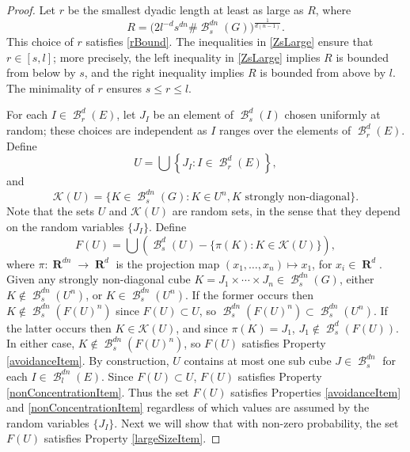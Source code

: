 \documentclass[dvipsnames,letterpaper,12pt]{article}
\numberwithin{equation}{section}
\theoremstyle{plain}
\theoremstyle{remark}
\DeclareMathOperator{\RR}{\mathbf{R}}
\DeclareMathOperator{\setcolon}{\colon}
\DeclareMathOperator{\B}{\mathcal{B}}
\begin{document}
\begin{proof}
	Let $r$ be the smallest dyadic length at least as large as $R$, where
	\begin{equation} \label{What-is-r}
		R = \big(2 l^{-d}s^{dn}\# \B^{dn}_s(G)\big)^{\frac{1}{d(n-1)}}.
	\end{equation} 
	This choice of $r$ satisfies \eqref{rBound}. 
	The inequalities in \eqref{ZsLarge} ensure that $r \in [s,l]$; more precisely, the left inequality in \eqref{ZsLarge} implies $R$ is bounded from below by $s$, and the right inequality implies $R$ is bounded from above by $l$. The minimality of $r$ ensures $s \leq r \leq l$.

	For each $I \in \B_r^d(E)$, let $J_I$ be an element of $\B^d_s(I)$ chosen uniformly at random; these choices are independent as $I$ ranges over the elements of $\B_r^d(E)$. Define
	\[ 	U = \bigcup \left\{ J_I \setcolon I \in \B_r^d(E) \right\}, \]
	and
	\[ \mathcal{K}(U) = \{ K \in \B^{dn}_s(G) \setcolon K \in U^n, \text{$K$ strongly non-diagonal} \}. \]
	Note that the sets $U$ and $\mathcal{K}(U)$ are random sets, in the sense that they depend on the random variables $\{ J_I \}$. Define
	\begin{equation} \label{defnOfF}
		F(U) = \bigcup \left( \B^d_s(U) - \{ \pi(K) \setcolon K \in \mathcal{K}(U) \} \right),
	\end{equation}
	where $\pi \colon \RR^{dn} \to \RR^d$ is the projection map $(x_1, \dots, x_n) \mapsto x_1$, for $x_i \in \RR^d$. Given any strongly non-diagonal cube $K = J_1 \times \cdots \times J_n \in \B_s^{dn}(G)$, either $K \not \in \B_s^{dn}(U^n)$, or $K \in \B_s^{dn}(U^n)$. If the former occurs then $K \not \in \B_s^{dn}(F(U)^n)$ since $F(U) \subset U$, so $\B_s^{dn}(F(U)^n) \subset \B_s^{dn}(U^n)$. If the latter occurs then $K \in \mathcal{K}(U)$, and since $\pi(K) = J_1$, $J_1 \not \in \B_s^d(F(U))$. In either case, $K \not \in \B_s^{dn}(F(U)^n)$, so $F(U)$ satisfies Property \ref{avoidanceItem}. By construction, $U$ contains at most one sub cube $J \in \B^{dn}_s$ for each $I \in \B^{dn}_l(E)$. Since $F(U) \subset U$, $F(U)$ satisfies Property \ref{nonConcentrationItem}. Thus the set $F(U)$ satisfies Properties \ref{avoidanceItem} and \ref{nonConcentrationItem} regardless of which values are assumed by the random variables $\{ J_I \}$. Next we will show that with non-zero probability, the set $F(U)$ satisfies Property \ref{largeSizeItem}. 


\end{proof}
\end{document}
